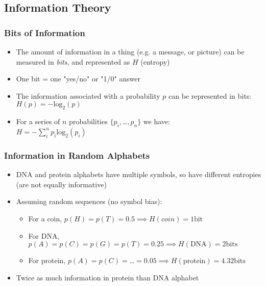 %

\subsection{Information Theory}
\begin{frame}
  \frametitle{Bits of Information}
  \begin{itemize}
    \item<1-> The amount of information in a thing (e.g. a message, or picture) can be measured in \emph{bits}, and represented as $H$ (entropy)
    \item<1-> One bit = one "yes/no" or "1/0" answer
    \item<2-> The information associated with a probability $p$ can be represented in bits: \\
              $H(p) = -\text{log}_2(p)$
    \item<2-> For a series of $n$ probabilities $\{p_i,$\ldots$, p_n\}$ we have: \\
              $H = -\sum^{n}_{i} p_i \text{log}_2 (p_i)$
  \end{itemize}
\end{frame}

\begin{frame}
  \frametitle{Information in Random Alphabets}
  \begin{itemize}
    \item DNA and protein alphabets have multiple symbols, so have different entropies (are not equally informative)
    \item Assuming random sequences (no symbol bias):
    \begin{itemize}
      \item For a coin, $p(H) = p(T) = 0.5 \implies H(coin) = 1\text{bit}$
      \item For DNA, $p(A) = p(C) = p(G) = p(T) = 0.25 \implies H(\text{DNA}) = 2\text{bits}$       
      \item For protein, $p(A) = p(C) = $\ldots$ = 0.05 \implies H(\text{protein}) = 4.32\text{bits}$
    \end{itemize}
    \item Twice as much information in protein than DNA alphabet
  \end{itemize}
\end{frame}

